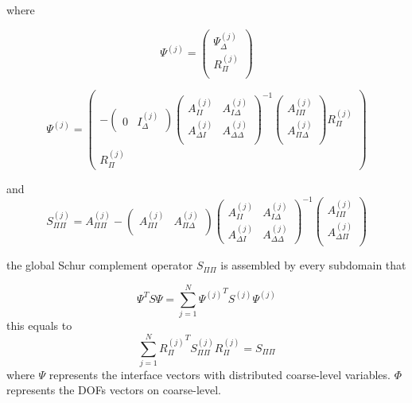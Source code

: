  where
 
 \begin{equation}
 \Psi^{(j)} = \begin{pmatrix}
 \Psi_{\Delta}^{(j)} \\ R_{\Pi}^{(j)} \\
 \end{pmatrix}
 \end{equation}
 
 \begin{equation}
 \Psi^{(j)} = \begin{pmatrix}
 -\begin{pmatrix}
 0 & I_{\Delta}^{(j)} 
 \end{pmatrix} \begin{pmatrix}
 A_{II}^{(j)} & A_{I \Delta}^{(j)} \\
 A_{\Delta I}^{(j)} & A_{\Delta \Delta}^{(j)} \\
 \end{pmatrix}^{-1} \begin{pmatrix}
 A_{I \Pi}^{(j)} \\ A_{\Pi \Delta}^{(j)} \\
 \end{pmatrix} R_{\Pi}^{(j)} \\
 R_{\Pi}^{(j)}
 \end{pmatrix}
 \end{equation}
 
 and 
 \begin{equation}
 S_{\Pi \Pi}^{(j)} = A_{\Pi \Pi}^{(j)} - \begin{pmatrix}
 A_{\Pi I}^{(j)} & A_{\Pi \Delta}^{(j)} \\
 \end{pmatrix} \begin{pmatrix}
 A_{II}^{(j)} & A_{I \Delta}^{(j)} \\
 A_{\Delta I}^{(j)} & A_{\Delta \Delta}^{(j)}
 \end{pmatrix}^{-1} \begin{pmatrix}
 A_{I \Pi}^{(j)} \\ A_{\Delta \Pi}^{(j)}\\
 \end{pmatrix}
 \end{equation}
 
 the global Schur complement operator $ S_{\Pi \Pi} $ is assembled by every subdomain that
 
 \begin{equation}
 \Psi^{T} S \Psi = \sum_{j = 1}^{N} {\Psi^{(j)}}^{T} S^{(j)} \Psi^{(j)} 
 \end{equation}
 this equals to 
 \begin{equation}
 \sum_{j = 1}^{N} {R_{\Pi}^{(j)}}^{T} S_{\Pi \Pi}^{(j)} R_{\Pi}^{(j)} = S_{\Pi\Pi}
 \end{equation}
 where $ \Psi $ represents the interface vectors with distributed coarse-level variables. $ \Phi $ represents the DOFs vectors on coarse-level.
 
